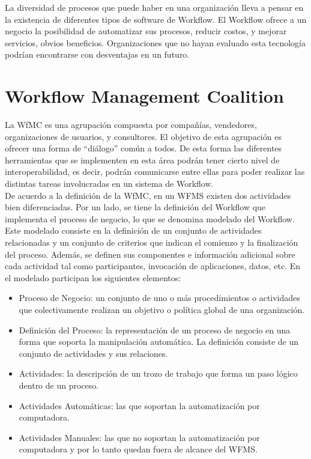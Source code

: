 La diversidad de procesos que puede haber en una organización lleva a pensar en la existencia de diferentes tipos de software de Workflow. El Workflow ofrece a un negocio la posibilidad de automatizar sus procesos, reducir costos, y mejorar servicios, obvios beneficios. Organizaciones que no hayan evaluado esta tecnología podrían encontrarse con desventajas en un futuro.

\section{Workflow Management Coalition}
\label{Workflow Management Coalition}

La WfMC es una agrupación compuesta por compañías, vendedores, organizaciones de usuarios, y consultores. El objetivo de esta agrupación es ofrecer una forma de ``diálogo'' común a todos. De esta forma las diferentes herramientas que se implementen en esta área podrán tener cierto nivel de interoperabilidad, es decir, podrán comunicarse entre ellas para poder realizar las distintas tareas involucradas en un sistema de Workflow.\\

De acuerdo a la definición de la WfMC, en un WFMS existen dos actividades bien diferenciadas. Por un lado, se tiene la definición del Workflow que implementa el proceso de negocio, lo que se denomina modelado del Workflow. Este modelado consiste en la definición de un conjunto de actividades relacionadas y un conjunto de criterios que indican el comienzo y la finalización del proceso. Además, se definen sus componentes e información adicional sobre cada actividad tal como participantes, invocación de aplicaciones, datos, etc. En el modelado participan los siguientes elementos:

\begin{itemize}
	\item Proceso de Negocio: un conjunto de uno o más procedimientos o actividades que colectivamente realizan un objetivo o política global de una organización.
	
	\item Definición del Proceso: la representación de un proceso de negocio en una forma que soporta la manipulación automática. La definición consiste de un conjunto de actividades y sus relaciones.
	
	\item Actividades: la descripción de un trozo de trabajo que forma un paso lógico dentro de un proceso.
	
	\item Actividades Automáticas: las que soportan la automatización por computadora. 
	
	\item Actividades Manuales: las que no soportan la automatización por computadora y por lo tanto quedan fuera de alcance del WFMS.
\end{itemize}

